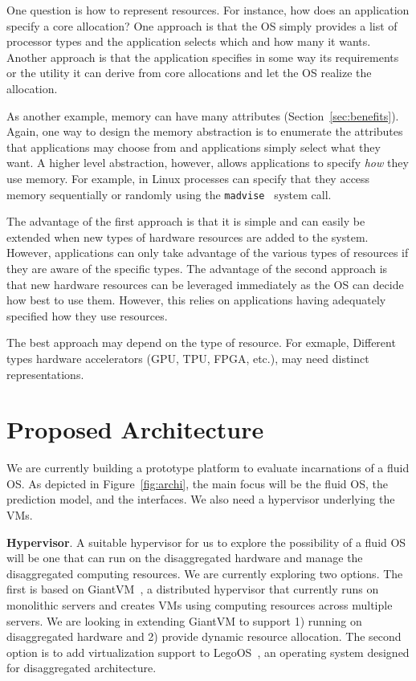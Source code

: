 One question is how to represent resources. For instance, how does
an application specify a core allocation?
One approach is that the OS simply provides a list of
processor types and the application selects which and how many it
wants.
Another approach is that the application specifies in some way
its requirements or the utility it can derive from core allocations
and let the OS realize the allocation.

As another example, memory can have many attributes
(Section~\ref{sec:benefits}).  Again, one way to design the memory
abstraction is to enumerate the attributes that applications may
choose from and applications simply select what they want.  A higher
level abstraction, however, allows applications to specify \emph{how}
they use memory.  For example, in Linux processes can specify that
they access memory sequentially or randomly using the
\texttt{madvise}~\cite{madvise} system call.

The advantage of the first approach is that it is simple and can
easily be extended when new types of hardware resources are added 
to the system.  However, applications can only take advantage of
the various types of resources if they are aware of the specific
types.  The advantage of the second approach is that new hardware
resources can be leveraged immediately as the OS can decide how
best to use them.  However, this relies on applications having
adequately specified how they use resources.

The best approach may depend on the type of resource.
For exmaple, Different types hardware accelerators
(GPU, TPU, FPGA, etc.), may need distinct representations.
 
\section{Proposed Architecture}
\label{sec:proposal}
We are currently building a prototype platform to evaluate incarnations
of a fluid OS. As depicted in Figure~\ref{fig:archi}, the main focus
will be the fluid OS, the prediction model, and the interfaces.
We also need a hypervisor underlying the VMs.

\noindent \textbf{Hypervisor}. A suitable hypervisor for us to
explore the possibility of a fluid OS will be one that can run on
the disaggregated hardware and manage the disaggregated computing
resources. We are currently exploring two options.  The first is
based on GiantVM~\cite{zhang2020giantvm}, a distributed hypervisor
that currently runs on monolithic servers and creates VMs using
computing resources across multiple servers.  We are looking in
extending GiantVM to support 1) running on
disaggregated hardware and 2) provide dynamic resource allocation.
The second option is to add virtualization support to
LegoOS~\cite{shan2018legoos}, an operating system designed for
disaggregated architecture.

